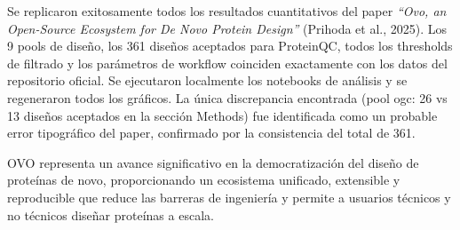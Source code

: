 \documentclass[10pt,a4paper,twocolumn]{article}
\begin{document}
Se replicaron exitosamente todos los resultados cuantitativos del paper \textit{``Ovo, an Open-Source Ecosystem for De Novo Protein Design''} (Prihoda et al., 2025). Los 9 pools de diseño, los 361 diseños aceptados para ProteinQC, todos los thresholds de filtrado y los parámetros de workflow coinciden exactamente con los datos del repositorio oficial. Se ejecutaron localmente los notebooks de análisis y se regeneraron todos los gráficos. La única discrepancia encontrada (pool ogc: 26 vs 13 diseños aceptados en la sección Methods) fue identificada como un probable error tipográfico del paper, confirmado por la consistencia del total de 361.

OVO representa un avance significativo en la democratización del diseño de proteínas de novo, proporcionando un ecosistema unificado, extensible y reproducible que reduce las barreras de ingeniería y permite a usuarios técnicos y no técnicos diseñar proteínas a escala.
\end{document}
